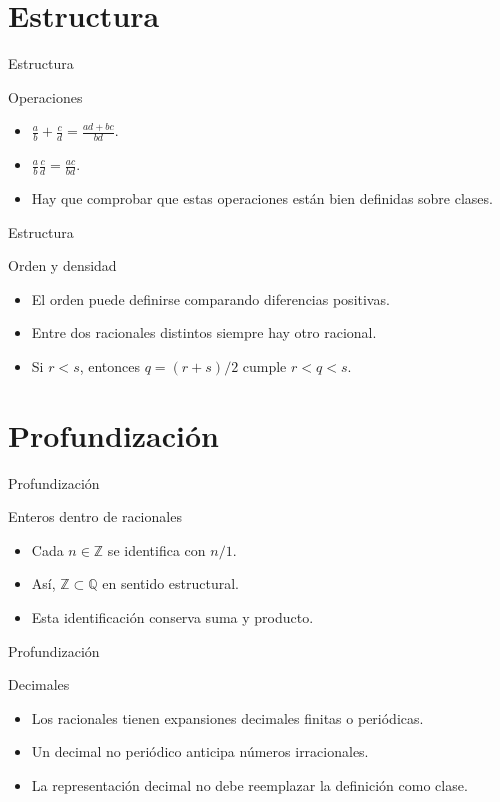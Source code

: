 \documentclass[aspectratio=169,11pt]{beamer}
\begin{document}
\section{Estructura}

\begin{frame}{Estructura}
\begin{block}{Operaciones}
\begin{itemize}
  \item \(\frac{a}{b}+\frac{c}{d}=\frac{ad+bc}{bd}\).
  \item \(\frac{a}{b}\frac{c}{d}=\frac{ac}{bd}\).
  \item Hay que comprobar que estas operaciones están bien definidas sobre clases.
\end{itemize}
\end{block}
\end{frame}

\begin{frame}{Estructura}
\begin{block}{Orden y densidad}
\begin{itemize}
  \item El orden puede definirse comparando diferencias positivas.
  \item Entre dos racionales distintos siempre hay otro racional.
  \item Si \(r<s\), entonces \(q=(r+s)/2\) cumple \(r<q<s\).
\end{itemize}
\end{block}
\end{frame}

\section{Profundización}

\begin{frame}{Profundización}
\begin{block}{Enteros dentro de racionales}
\begin{itemize}
  \item Cada \(n\in\mathbb{Z}\) se identifica con \(n/1\).
  \item Así, \(\mathbb{Z}\subset\mathbb{Q}\) en sentido estructural.
  \item Esta identificación conserva suma y producto.
\end{itemize}
\end{block}
\end{frame}

\begin{frame}{Profundización}
\begin{block}{Decimales}
\begin{itemize}
  \item Los racionales tienen expansiones decimales finitas o periódicas.
  \item Un decimal no periódico anticipa números irracionales.
  \item La representación decimal no debe reemplazar la definición como clase.
\end{itemize}
\end{block}
\end{frame}
\end{document}
